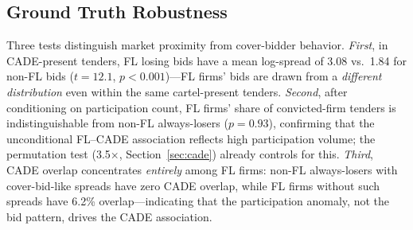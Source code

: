 
\subsection{Ground Truth Robustness}
\label{sec:ground_truth}

Three tests distinguish market proximity from cover-bidder behavior.
\emph{First}, in CADE-present tenders, FL losing bids have a mean
log-spread of 3.08 vs.\ 1.84 for non-FL bids ($t = 12.1$,
$p < 0.001$)---FL firms' bids are drawn from a \emph{different
distribution} even within the same cartel-present tenders.
\emph{Second}, after conditioning on participation count, FL firms'
share of convicted-firm tenders is indistinguishable from non-FL
always-losers ($p = 0.93$), confirming that the unconditional
FL--CADE association reflects high participation volume; the
permutation test (3.5$\times$, Section~\ref{sec:cade}) already
controls for this.
\emph{Third}, CADE overlap concentrates \emph{entirely} among FL
firms: non-FL always-losers with cover-bid-like spreads have zero
CADE overlap, while FL firms without such spreads have 6.2\%
overlap---indicating that the participation anomaly, not the bid
pattern, drives the CADE association.
